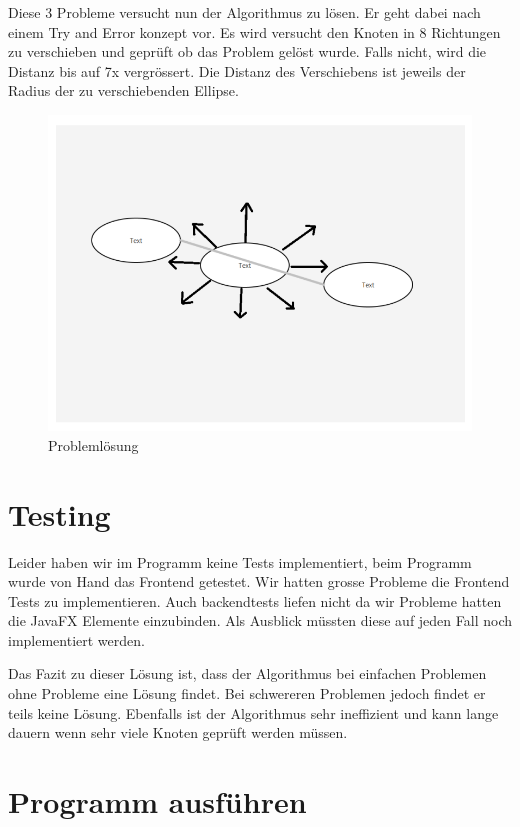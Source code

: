 Diese 3 Probleme versucht nun der Algorithmus zu lösen. Er geht dabei nach einem Try and Error konzept vor. Es wird versucht den Knoten in 8 Richtungen zu verschieben und geprüft ob das Problem gelöst wurde. Falls nicht, wird die Distanz bis auf 7x vergrössert. Die Distanz des Verschiebens ist jeweils der Radius der zu verschiebenden Ellipse. 

\begin{figure}[H]
	\centering
		\includegraphics[scale=0.5]{images/solving.PNG}
	\caption{Problemlösung}
	\label{fig:problemloesung}
\end{figure}

\section{Testing}
\label{sec:testing}
Leider haben wir im Programm keine Tests implementiert, beim Programm wurde von Hand das Frontend getestet. Wir hatten grosse Probleme die Frontend Tests zu implementieren. Auch backendtests
liefen nicht da wir Probleme hatten die JavaFX Elemente einzubinden. Als Ausblick müssten diese 
auf jeden Fall noch implementiert werden.


Das Fazit zu dieser Lösung ist, dass der Algorithmus bei einfachen Problemen ohne Probleme eine Lösung findet. Bei schwereren Problemen jedoch findet er teils keine Lösung. Ebenfalls ist der Algorithmus sehr ineffizient und kann lange dauern wenn sehr viele Knoten geprüft werden müssen. 

\section{Programm ausführen}
\label{sec:run_program}

